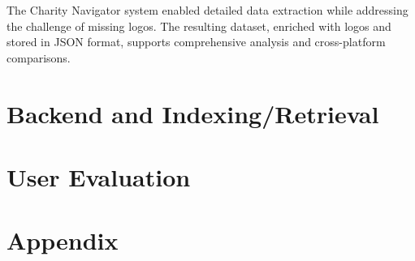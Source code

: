 \documentclass[unicode,9pt,a4paper,oneside,numbers=endperiod,openany]{scrartcl}
\begin{document}
The Charity Navigator system enabled detailed data extraction while addressing the challenge of missing logos. The resulting dataset, enriched with logos and stored in JSON format, supports comprehensive analysis and cross-platform comparisons.


\section{Backend and Indexing/Retrieval}

\section{User Evaluation}

\section{Appendix}
\end{document}
